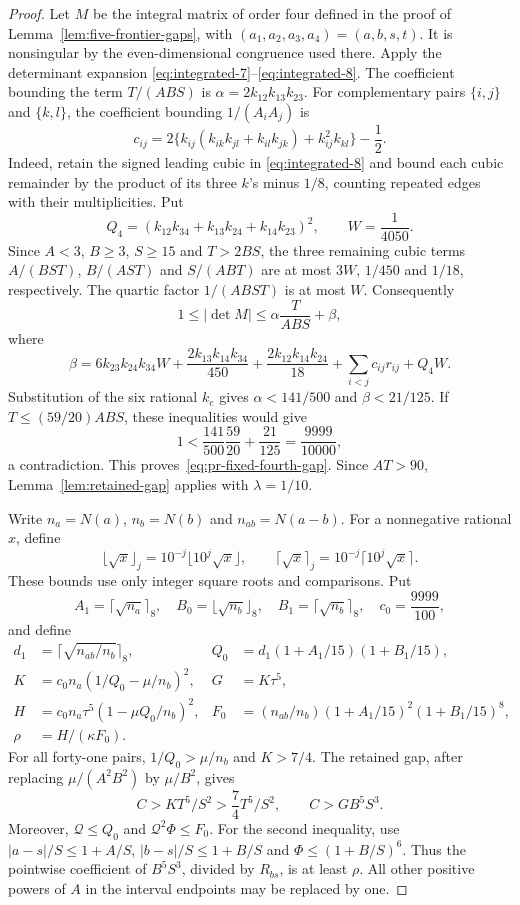 \documentclass[12pt]{article}
\numberwithin{equation}{section}
\begin{document}
\begin{proof}
Let $M$ be the integral matrix of order four defined in the proof of
Lemma~\ref{lem:five-frontier-gaps}, with $(a_1,a_2,a_3,a_4)=(a,b,s,t)$.
It is nonsingular by the even-dimensional congruence used there.
Apply the determinant expansion
\eqref{eq:integrated-7}--\eqref{eq:integrated-8}. The coefficient
bounding the term $T/(ABS)$ is
$\alpha=2k_{12}k_{13}k_{23}$. For complementary pairs $\{i,j\}$
and $\{k,l\}$, the coefficient bounding $1/(A_iA_j)$ is
\begin{equation}\label{eq:pr-pair-defect}
 c_{ij}=2\{k_{ij}(k_{ik}k_{jl}+k_{il}k_{jk})
                  +k_{ij}^2k_{kl}\}-\frac12.
\end{equation}
Indeed, retain the signed leading cubic in
\eqref{eq:integrated-8} and bound each cubic remainder by the
product of its three $k$'s minus $1/8$, counting repeated edges
with their multiplicities. Put
\[
 Q_4=(k_{12}k_{34}+k_{13}k_{24}+k_{14}k_{23})^2,\qquad
 W=\frac1{4050}.
\]
Since $A<3$, $B\ge3$, $S\ge15$ and $T>2BS$, the three remaining
cubic terms $A/(BST)$, $B/(AST)$ and $S/(ABT)$ are at most
$3W$, $1/450$ and $1/18$, respectively. The quartic factor
$1/(ABST)$ is at most $W$. Consequently
\[
 1\le|\det M|\le\alpha\frac{T}{ABS}+\beta,
\]
where
\[
 \beta=6k_{23}k_{24}k_{34}W
       +\frac{2k_{13}k_{14}k_{34}}{450}
       +\frac{2k_{12}k_{14}k_{24}}{18}
       +\sum_{i<j}c_{ij}r_{ij}+Q_4W.
\]
Substitution of the six rational $k_e$ gives
$\alpha<141/500$ and $\beta<21/125$. If $T\le(59/20)ABS$,
these inequalities would give
\[
 1<\frac{141}{500}\frac{59}{20}+\frac{21}{125}
   =\frac{9999}{10000},
\]
a contradiction. This proves~\eqref{eq:pr-fixed-fourth-gap}.
Since $AT>90$, Lemma~\ref{lem:retained-gap} applies with
$\lambda=1/10$.

Write $n_a=N(a)$, $n_b=N(b)$ and $n_{ab}=N(a-b)$. For a nonnegative
rational $x$, define
\[
 \lfloor\sqrt{x}\rfloor_j=10^{-j}\lfloor10^j\sqrt{x}\rfloor,
 \qquad
 \lceil\sqrt{x}\rceil_j=10^{-j}\lceil10^j\sqrt{x}\rceil.
\]
These bounds use only integer square roots and comparisons. Put
\[
 A_1=\lceil\sqrt{n_a}\rceil_8,\quad
 B_0=\lfloor\sqrt{n_b}\rfloor_8,\quad
 B_1=\lceil\sqrt{n_b}\rceil_8,\quad c_0=\frac{9999}{100},
\]
and define
\begin{align*}
 d_1&=\lceil\sqrt{n_{ab}/n_b}\rceil_8,&
 Q_0&=d_1(1+A_1/15)(1+B_1/15),\\
 K&=c_0n_a(1/Q_0-\mu/n_b)^2,&G&=K\tau^5,\\
 H&=c_0n_a\tau^5(1-\mu Q_0/n_b)^2,&
 F_0&=(n_{ab}/n_b)(1+A_1/15)^2(1+B_1/15)^8,\\
 \rho&=H/(\kappa F_0).&&
\end{align*}
For all forty-one pairs, $1/Q_0>\mu/n_b$ and $K>7/4$.
The retained gap, after replacing $\mu/(A^2B^2)$ by $\mu/B^2$, gives
\[
 C>K T^5/S^2>\frac74T^5/S^2,\qquad C>GB^5S^3.
\]
Moreover, $\mathcal Q\le Q_0$ and $\mathcal Q^2\Phi\le F_0$.
For the second inequality, use $|a-s|/S\le1+A/S$,
$|b-s|/S\le1+B/S$ and $\Phi\le(1+B/S)^6$.
Thus the pointwise coefficient of $B^5S^3$, divided by $R_{bs}$,
is at least $\rho$. All other positive powers of $A$ in the
interval endpoints may be replaced by one.


\end{proof}
\end{document}
